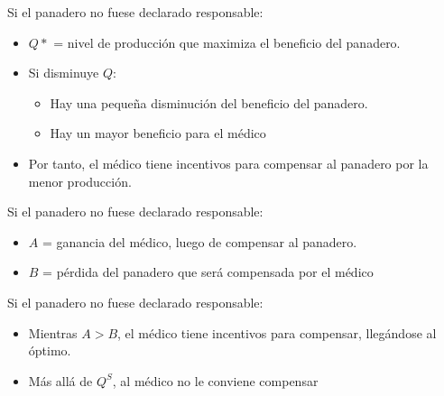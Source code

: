 \begin{frame}{Si el panadero no fuese declarado responsable:}
	\begin{multicols}{2}
		\begin{itemize}
			\item $Q\ast$ = nivel de producción que maximiza el beneficio del panadero.
			\item Si disminuye $Q$:
				\begin{itemize}
					\item Hay una pequeña disminución del beneficio del panadero.
					\item Hay un mayor beneficio para el médico
				\end{itemize}
			\item Por tanto, el médico tiene incentivos para compensar al panadero por la menor producción.
		\end{itemize}
		
		\begin{center}
			
		\end{center}
	\end{multicols}
\end{frame}
\begin{frame}{Si el panadero no fuese declarado responsable:}
	\begin{multicols}{2}
		\begin{itemize}
			\item $A$ = ganancia del médico, luego de compensar al panadero.
			\item $B$ = pérdida del panadero que será compensada por el médico
		\end{itemize}
		
		\begin{center}
			
		\end{center}
	\end{multicols}
\end{frame}
\begin{frame}{Si el panadero no fuese declarado responsable:}
	\begin{multicols}{2}
		\begin{itemize}
			\item Mientras $A >B$, el médico tiene incentivos para compensar, llegándose al óptimo.
			\item Más allá de $Q^S$, al médico no le conviene compensar
		\end{itemize}
		
		\begin{center}
			
		\end{center}
	\end{multicols}
\end{frame}
